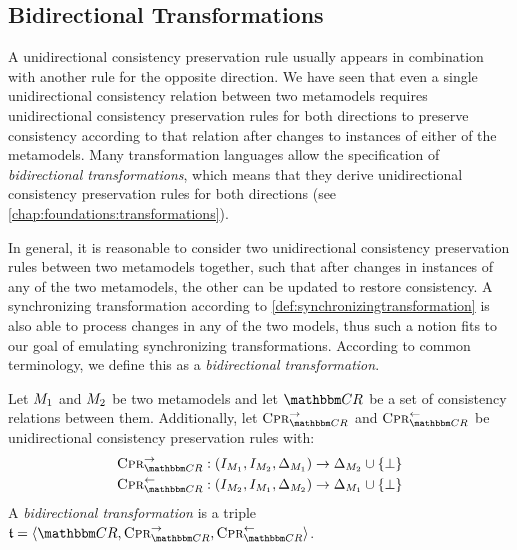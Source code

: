 \subsection{Bidirectional Transformations}

A unidirectional consistency preservation rule usually appears in combination with another rule for the opposite direction.
We have seen that even a single unidirectional consistency relation between two metamodels requires unidirectional consistency preservation rules for both directions to preserve consistency according to that relation after changes to instances of either of the metamodels.
Many transformation languages allow the specification of \emph{bidirectional transformations}, which means that they derive unidirectional consistency preservation rules for both directions (see \autoref{chap:foundations:transformations}).

In general, it is reasonable to consider two unidirectional consistency preservation rules between two metamodels together, such that after changes in instances of any of the two metamodels, the other can be updated to restore consistency.
A synchronizing transformation according to \autoref{def:synchronizingtransformation} is also able to process changes in any of the two models, thus such a notion fits to our goal of emulating synchronizing transformations.
According to common terminology, we define this as a \emph{bidirectional transformation}.

\begin{definition}
    \label{def:bidirectionaltransformation}
    Let $\metamodel{M}{1}$ and $\metamodel{M}{2}$ be two metamodels and let $\consistencyrelationset{CR}$ be a set of consistency relations between them.
    Additionally, let $\consistencypreservationrule{\consistencyrelationset{CR}}^{\rightarrow}$ and $\consistencypreservationrule{\consistencyrelationset{CR}}^{\leftarrow}$ be unidirectional consistency preservation rules with:
    \begin{align*}
        &
        \consistencypreservationrule{\consistencyrelationset{CR}}^{\rightarrow} : (\metamodelinstanceset{M}{1}, \metamodelinstanceset{M}{2}, \changeuniverse{\metamodel{M}{1}}) \rightarrow \changeuniverse{\metamodel{M}{2}} \cup \setted{\bot} \\
        &
        \consistencypreservationrule{\consistencyrelationset{CR}}^{\leftarrow} : (\metamodelinstanceset{M}{2}, \metamodelinstanceset{M}{1}, \changeuniverse{\metamodel{M}{2}}) \rightarrow \changeuniverse{\metamodel{M}{1}} \cup \setted{\bot}
    \end{align*}
    A \emph{bidirectional transformation} is a triple $\transformation{t} = \tupled{\consistencyrelationset{CR},\consistencypreservationrule{\consistencyrelationset{CR}}^{\rightarrow}, \consistencypreservationrule{\consistencyrelationset{CR}}^{\leftarrow}}$.
\end{definition}

